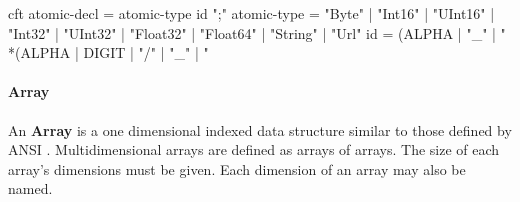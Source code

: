 \documentclass[justify]{nasa-ese}
\begin{document}
\begin{vcode}{cft}
atomic-decl = atomic-type id ";" 
atomic-type = "Byte" | "Int16" | "UInt16" | "Int32" | "UInt32" 
                 | "Float32" | "Float64" | "String" | "Url" 
id          = (ALPHA | "_" | "%
              *(ALPHA | DIGIT | "/" | "_" | "%
\end{vcode}
     




\paragraph{Array}
An \textbf{Array} is a one dimensional indexed data structure similar
to those defined by
ANSI \C. Multidimensional arrays are defined as arrays of arrays. The size of
each array's dimensions must be given. Each dimension of an array may also be
named.

\end{document}
